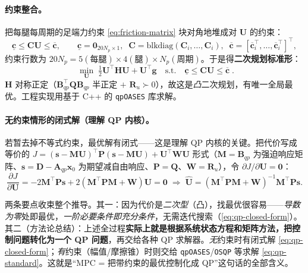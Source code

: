 \paragraph{约束整合。}
把每腿每周期的足端力约束 \cref{eq:friction-matrix} 块对角地堆成对 $\mathbf{U}$ 的约束\cite{yu2021quadruped}：
\begin{equation}
  \underline{\mathbf{c}}\le\mathbf{C}\mathbf{U}\le\overline{\mathbf{c}},\qquad
  \underline{\mathbf{c}}=\mathbf{0}_{20N_p\times1},\;\;
  \mathbf{C}=\mathrm{blkdiag}(\mathbf{C}_i,\dots,\mathbf{C}_i),\;\;
  \overline{\mathbf{c}}=[\overline{\mathbf{c}}_i^\top,\dots,\overline{\mathbf{c}}_i^\top]^\top,
  \label{eq:qp-constraint}
\end{equation}
约束行数为 $20N_p=5(\text{每腿})\times4(\text{腿})\times N_p(\text{周期})$。于是得\textbf{二次规划标准形}\cite{yu2021quadruped}：
\begin{equation}
  \boxed{\;\min_{\mathbf{U}}\;\tfrac12\mathbf{U}^\top\mathbf{H}\mathbf{U}+\mathbf{U}^\top\mathbf{g}\quad\text{s.t.}\quad\underline{\mathbf{c}}\le\mathbf{C}\mathbf{U}\le\overline{\mathbf{c}}\;}.
  \label{eq:qp-standard}
\end{equation}
$\mathbf{H}$ 对称正定（$\mathbf{B}_{qp}^\top\mathbf{Q}\mathbf{B}_{qp}$ 半正定 $+$ $\mathbf{R}_u\succ0$），故这是\emph{凸}二次规划，有唯一全局最优。工程实现用基于 C++ 的 \texttt{qpOASES} 库求解\cite{yu2021quadruped}。

\paragraph{无约束情形的闭式解（理解 QP 内核）。}
若暂去掉不等式约束，最优解有闭式——这是理解 QP 内核的关键。把代价写成等价的 $J=(\mathbf{s}-\mathbf{M}\mathbf{U})^\top\mathbf{P}(\mathbf{s}-\mathbf{M}\mathbf{U})+\mathbf{U}^\top\mathbf{W}\mathbf{U}$ 形式（$\mathbf{M}=\mathbf{B}_{qp}$ 为强迫响应矩阵、$\mathbf{s}=\mathbf{D}-\mathbf{A}_{qp}\boldsymbol{x}_0$ 为期望减自由响应、$\mathbf{P}=\mathbf{Q}$、$\mathbf{W}=\mathbf{R}_u$），令 $\partial J/\partial\mathbf{U}=\mathbf{0}$\cite{yu2021quadruped}：
\begin{equation}
  \frac{\partial J}{\partial\mathbf{U}}=-2\mathbf{M}^\top\mathbf{P}\mathbf{s}+2(\mathbf{M}^\top\mathbf{P}\mathbf{M}+\mathbf{W})\mathbf{U}=\mathbf{0}
  \;\Longrightarrow\;
  \boxed{\hat{\mathbf{U}}=(\mathbf{M}^\top\mathbf{P}\mathbf{M}+\mathbf{W})^{-1}\mathbf{M}^\top\mathbf{P}\mathbf{s}}.
  \label{eq:qp-closed-form}
\end{equation}

\begin{insight}[二次型 $\Rightarrow$ 导数为零即唯一全局最优；MPC 本质 = 化为 QP]\label{ins:qp-essence}
两条要点收束整个推导。其一：因为代价是\emph{二次型}（凸），找最优很容易——\emph{导数为零}处即最优，\emph{一阶必要条件即充分条件}，无需迭代搜索（\cref{eq:qp-closed-form}）。其二（方法论总结）：上述全过程\textbf{实际上就是根据系统状态方程和矩阵方法，把控制问题转化为一个 QP 问题}，再交给各种 QP 求解器。\emph{无}约束时有闭式解 \cref{eq:qp-closed-form}；\emph{有}约束（幅值/摩擦锥）时则交给 \texttt{qpOASES}/\texttt{OSQP} 等求解 \cref{eq:qp-standard}。这就是“MPC = 把带约束的最优控制化成 QP”这句话的全部含义。
\end{insight}

